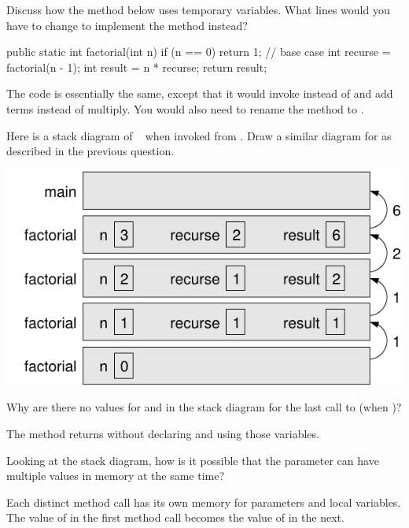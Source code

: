 \Q Discuss how the  method below uses temporary variables.
What lines would you have to change to implement the  method instead?

\begin{multicols}{2}

\vspace{1ex}
\begin{javalst}
public static int factorial(int n) {
    if (n == 0) {
        return 1;  // base case
    }
    int recurse = factorial(n - 1);
    int result = n * recurse;
    return result;
}
\end{javalst}

\columnbreak

\begin{answer}
The code is essentially the same, except that it would invoke  instead of  and add terms instead of multiply.
You would also need to rename the method to .
\end{answer}

\end{multicols}


\Q Here is a stack diagram of ~ when invoked from .
Draw a similar diagram for  as described in the previous question.

\vspace{1em}
\includegraphics[width=0.5\linewidth]{stack-factorial3.pdf}
\vspace{1em}



\Q Why are there no values for  and  in the stack diagram for the last call to  (when )?

\begin{answer}
The method returns without declaring and using those variables.
\end{answer}


\Q Looking at the stack diagram, how is it possible that the parameter  can have multiple values in memory at the same time?

\begin{answer}
Each distinct method call has its own memory for parameters and local variables.
The value of  in the first method call becomes the value of  in the next.
\end{answer}
